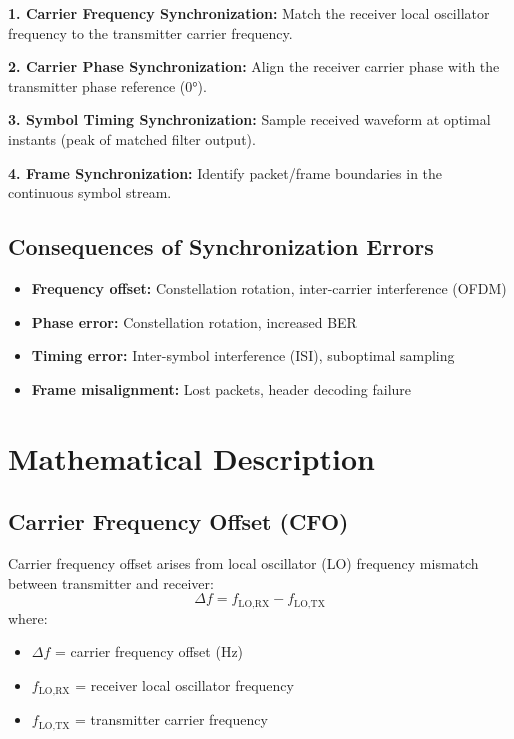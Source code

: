 \textbf{1. Carrier Frequency Synchronization:} Match the receiver local oscillator frequency to the transmitter carrier frequency.

\textbf{2. Carrier Phase Synchronization:} Align the receiver carrier phase with the transmitter phase reference ($0°$).

\textbf{3. Symbol Timing Synchronization:} Sample received waveform at optimal instants (peak of matched filter output).

\textbf{4. Frame Synchronization:} Identify packet/frame boundaries in the continuous symbol stream.

\subsection{Consequences of Synchronization Errors}

\begin{itemize}
\item \textbf{Frequency offset:} Constellation rotation, inter-carrier interference (OFDM)
\item \textbf{Phase error:} Constellation rotation, increased BER
\item \textbf{Timing error:} Inter-symbol interference (ISI), suboptimal sampling
\item \textbf{Frame misalignment:} Lost packets, header decoding failure
\end{itemize}

\section{Mathematical Description}

\subsection{Carrier Frequency Offset (CFO)}

Carrier frequency offset arises from local oscillator (LO) frequency mismatch between transmitter and receiver:
\begin{equation}
\Delta f = f_{\text{LO,RX}} - f_{\text{LO,TX}}
\end{equation}
where:
\begin{itemize}
\item $\Delta f$ = carrier frequency offset (Hz)
\item $f_{\text{LO,RX}}$ = receiver local oscillator frequency
\item $f_{\text{LO,TX}}$ = transmitter carrier frequency
\end{itemize}

